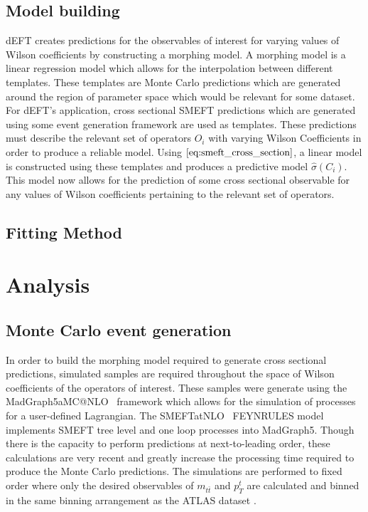 \documentclass[a4paper]{article}
\begin{document}
\subsection{Model building}
dEFT creates predictions for the observables of interest for varying values of Wilson coefficients by constructing a morphing model.
A morphing model is a linear regression model which allows for the interpolation between different templates.
These templates are Monte Carlo predictions which are generated around the region of parameter space which would be relevant for some dataset.
For dEFT's application, cross sectional SMEFT predictions which are generated using some event generation framework are used as templates.
These predictions must describe the relevant set of operators $O_{i}$ with varying Wilson Coefficients in order to produce a reliable model.
Using $\ref{eq:smeft_cross_section}$, a linear model is constructed using these templates and produces a predictive model $\hat{\sigma}({C_i})$.
This model now allows for the prediction of some cross sectional observable for any values of Wilson coefficients pertaining to the relevant set of operators.

\subsection{Fitting Method}

\section{Analysis}


\subsection{Monte Carlo event generation}
In order to build the morphing model required to generate cross sectional predictions, simulated samples are required throughout the space of Wilson coefficients of the operators of interest.
These samples were generate using the MadGraph5\textunderscore aMC@NLO~\cite{Alwall_2014} framework which allows for the simulation of processes for a user-defined Lagrangian.
The SMEFTatNLO~\cite{degrande2020automated} FEYNRULES model implements SMEFT tree level and one loop processes into MadGraph5.
Though there is the capacity to perform predictions at next-to-leading order, these calculations are very recent  and greatly increase the processing time required to produce the Monte Carlo predictions.
The simulations are performed to fixed order where only the desired observables of $m_{t\bar{t}}$ and ${p_{T}^{t}}$ are calculated and binned in the same binning arrangement as the ATLAS dataset .
\end{document}
